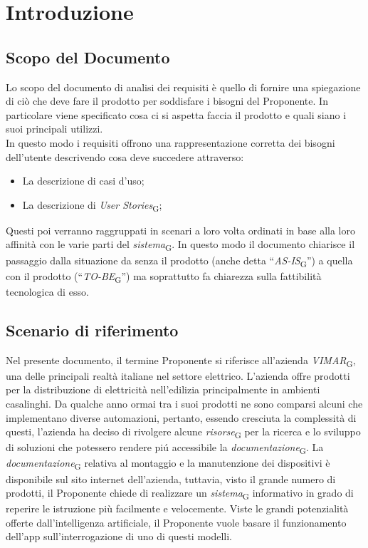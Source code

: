 \section{Introduzione}
\subsection{Scopo del Documento}
Lo scopo del documento di analisi dei requisiti è quello di fornire una spiegazione di ciò che deve fare il prodotto per soddisfare i bisogni del Proponente. In particolare viene specificato cosa ci si aspetta faccia il prodotto e quali siano i suoi principali utilizzi. \\
In questo modo i requisiti offrono una rappresentazione corretta dei bisogni dell’utente descrivendo cosa deve succedere attraverso:
\begin{itemize}
    \item La descrizione di casi d’uso;
    \item La descrizione di \textit{User Stories}\textsubscript{G};
\end{itemize}
Questi poi verranno raggruppati in scenari a loro volta ordinati in base alla loro affinità con le varie parti del \textit{sistema}\textsubscript{G}. In questo modo il documento chiarisce il passaggio dalla situazione da senza il prodotto (anche detta ``\textit{AS-IS}\textsubscript{G}”) a quella con il prodotto (“\textit{TO-BE}\textsubscript{G}”) ma soprattutto fa chiarezza sulla fattibilità tecnologica di esso.

\subsection{Scenario di riferimento} 
Nel presente documento, il termine Proponente si riferisce all'azienda \textit{VIMAR}\textsubscript{G}, una delle principali realtà italiane nel settore elettrico. L’azienda offre prodotti per la distribuzione di elettricità nell’edilizia principalmente in ambienti casalinghi. Da qualche anno ormai tra i suoi prodotti ne sono comparsi alcuni che implementano diverse automazioni, pertanto, essendo cresciuta la complessità di questi, l’azienda ha deciso di rivolgere alcune \textit{risorse}\textsubscript{G} per la ricerca e lo sviluppo di soluzioni che potessero rendere piú accessibile la \textit{documentazione}\textsubscript{G}. La \textit{documentazione}\textsubscript{G} relativa al montaggio e la manutenzione dei dispositivi è disponibile sul sito internet dell’azienda, tuttavia, visto il grande numero di prodotti, il Proponente chiede di realizzare un \textit{sistema}\textsubscript{G} informativo in grado di reperire le istruzione più facilmente e velocemente. Viste le grandi potenzialità offerte dall’intelligenza artificiale, il Proponente vuole basare il funzionamento dell’app sull’interrogazione di uno di questi modelli.

